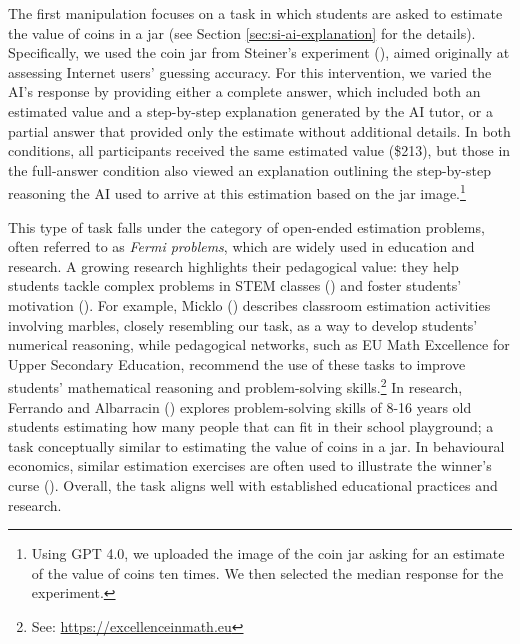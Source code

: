 \documentclass[
  11pt,
]{article}
\begin{document}
The first manipulation focuses on a task in which students are asked to estimate the value of coins in a jar (see Section \ref{sec:si-ai-explanation} for the details). Specifically, we used the coin jar from Steiner's experiment (), aimed originally at assessing Internet users' guessing accuracy. For this intervention, we varied the AI's response by providing either a complete answer, which included both an estimated value and a step-by-step explanation generated by the AI tutor, or a partial answer that provided only the estimate without additional details. In both conditions, all participants received the same estimated value (\$213), but those in the full-answer condition also viewed an explanation outlining the step-by-step reasoning the AI used to arrive at this estimation based on the jar image.\footnote{Using GPT 4.0, we uploaded the image of the coin jar asking for an estimate of the value of coins ten times. We then selected the median response for the experiment.}

This type of task falls under the category of open-ended estimation problems, often referred to as \emph{Fermi problems}, which are widely used in education and research. A growing research highlights their pedagogical value: they help students tackle complex problems in STEM classes () and foster students' motivation (). For example, Micklo () describes classroom estimation activities involving marbles, closely resembling our task, as a way to develop students' numerical reasoning, while pedagogical networks, such as EU Math Excellence for Upper Secondary Education, recommend the use of these tasks to improve students' mathematical reasoning and problem-solving skills.\footnote{See: \url{https://excellenceinmath.eu}} In research, Ferrando and Albarracin () explores problem-solving skills of 8-16 years old students estimating how many people that can fit in their school playground; a task conceptually similar to estimating the value of coins in a jar. In behavioural economics, similar estimation exercises are often used to illustrate the winner's curse (). Overall, the task aligns well with established educational practices and research.
\end{document}
